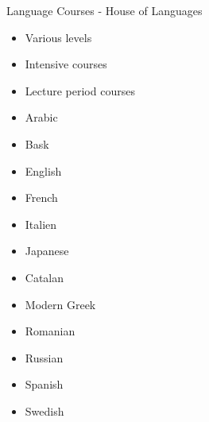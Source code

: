 \documentclass[aspectratio=169,hyperref={unicode}]{beamer}
\begin{document}
\begin{frame}{Language Courses - House of Languages}
\begin{minipage}{0.32\linewidth}
\begin{itemize}
	\item Various levels
	\item Intensive courses
	\item Lecture period courses
\end{itemize}
\end{minipage}\hfill
\begin{minipage}{0.32\linewidth}
\begin{itemize}
\item Arabic
\item Bask
\item English
\item French
\item Italien
\item Japanese
\end{itemize}
\end{minipage}
\hfill
\begin{minipage}{0.32\linewidth}
\begin{itemize}
\item Catalan
\item Modern Greek
\item Romanian
\item Russian
\item Spanish
\item Swedish
\end{itemize}
\end{minipage}

\end{frame}
\end{document}
